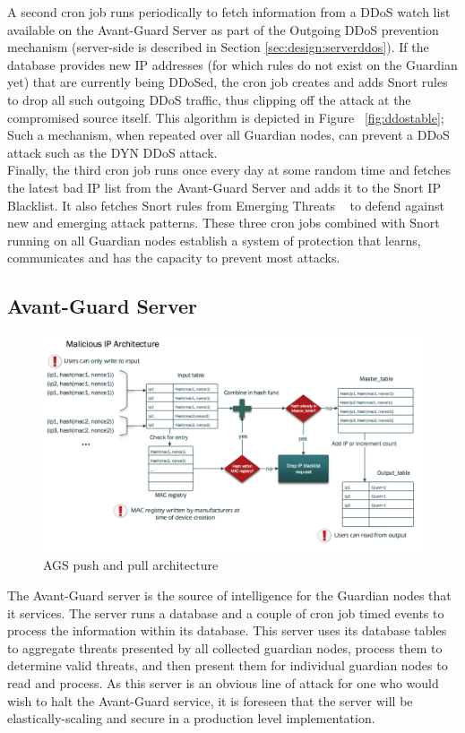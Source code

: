A second cron job runs periodically to fetch information from a DDoS watch list available on the Avant-Guard Server as 
part of the Outgoing DDoS prevention mechanism (server-side is described in Section \ref{sec:design:serverddos}). If the database provides new IP addresses (for which rules do not exist on the Guardian yet) that are currently being DDoSed, the cron job creates and adds Snort rules to drop all such outgoing DDoS traffic, thus clipping off the attack at the compromised source itself. 
This algorithm is depicted in Figure ~\ref{fig:ddostable}; Such a mechanism, when repeated over all Guardian nodes, can prevent a DDoS attack such as the DYN DDoS attack. \\

Finally, the third cron job runs once every day at some random time and fetches the latest bad IP list from the Avant-Guard Server and adds it to the Snort IP Blacklist. It also fetches Snort rules from Emerging Threats ~\cite{emerging} to defend against new and emerging attack patterns. These three cron jobs combined with Snort running on all Guardian nodes establish a system of protection that learns, communicates and has the capacity to prevent most attacks.

\subsection{Avant-Guard Server}
\label{sec:design:server}

\begin{figure}
    \centering
    \includegraphics[width=0.95\linewidth]{figs/blacklistserver.png}
    \caption{AGS push and pull architecture}
    \label{fig:blacklistserver}
\end{figure}

The Avant-Guard server is the source of intelligence for the Guardian nodes that it services. The server runs a database and a couple of cron job timed events to process the information within its database. This server uses its database tables to aggregate threats presented by all collected guardian nodes, process them to determine valid threats, and then present them for individual guardian nodes to read and process. As this server is an obvious line of attack for one who would wish to halt the Avant-Guard service, it is foreseen that the server will be elastically-scaling and secure in a production level implementation. 

